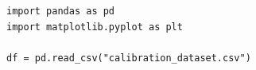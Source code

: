 \begin{lstlisting}[caption=Imports., label=lst:import]
import pandas as pd
import matplotlib.pyplot as plt

df = pd.read_csv("calibration_dataset.csv")
\end{lstlisting}